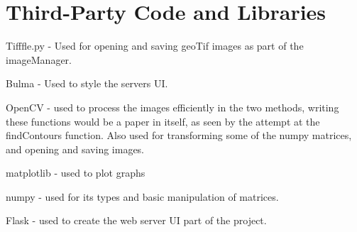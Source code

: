 \chapter{Third-Party Code and Libraries}
\begin{comment}
If you have made use of any third party code or software libraries, i.e. any code that you have not designed and written yourself, then you must include this appendix. 

As has been said in lectures, it is acceptable and likely that you will make use of third-party code and software libraries. If third party code or libraries are used, your work will build on that to produce notable new work. The key requirement is that we understand what your original work is and what work is based on that of other people. 

Therefore, you need to clearly state what you have used and where the original material can be found. Also, if you have made any changes to the original versions, you must explain what you have changed. 

The following is an example of what you might say. 

Apache POI library - The project has been used to read and write Microsoft Excel files (XLS) as part of the interaction with the client's existing system for processing data. Version 3.10-FINAL was used. The library is open source and it is available from the Apache Software Foundation 
\cite{apache_poi}. The library is released using the Apache License 
\cite{apache_license}. This library was used without modification. 

Include as many declarations as appropriate for your work. The specific wording is less important than the fact that you are declaring the relevant work.
\end{comment}

Tifffle.py - Used for opening and saving geoTif images as part of the imageManager. 


Bulma - Used to style the servers UI.


OpenCV - used to process the images efficiently in the two methods, writing these functions would be a paper in itself, as seen by the attempt at the findContours function. Also used for transforming some of the numpy matrices, and opening and saving images.


matplotlib - used to plot graphs



numpy - used for its types and basic manipulation of matrices. 


Flask - used to create the web server UI part of the project.